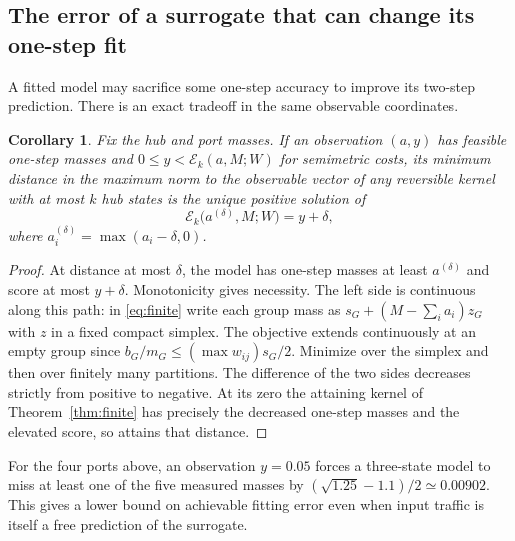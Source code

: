 \documentclass[11pt]{article}
\newtheorem{corollary}[theorem]{Corollary}
\newcommand{\E}{\mathcal E}
\begin{document}
\subsection{The error of a surrogate that can change its one-step fit}
A fitted model may sacrifice some one-step accuracy to improve its two-step prediction. There is an exact tradeoff in the same observable coordinates.
\begin{corollary}\label{cor:distance}
Fix the hub and port masses. If an observation \((a,y)\) has feasible one-step masses and \(0\le y<\E_k(a,M;W)\) for semimetric costs, its minimum distance in the maximum norm to the observable vector of any reversible kernel with at most \(k\) hub states is the unique positive solution of
\[
 \E_k\big(a^{(\delta)},M;W\big)=y+\delta ,
\]
where \(a^{(\delta)}_i=\max(a_i-\delta,0)\).
\end{corollary}
\begin{proof}
At distance at most \(\delta\), the model has one-step masses at least \(a^{(\delta)}\) and score at most \(y+\delta\). Monotonicity gives necessity. The left side is continuous along this path: in \eqref{eq:finite} write each group mass as \(s_G+(M-\sum_i a_i)z_G\) with \(z\) in a fixed compact simplex. The objective extends continuously at an empty group since \(b_G/m_G\le (\max w_{ij})s_G/2\). Minimize over the simplex and then over finitely many partitions. The difference of the two sides decreases strictly from positive to negative. At its zero the attaining kernel of Theorem~\ref{thm:finite} has precisely the decreased one-step masses and the elevated score, so attains that distance.
\end{proof}

For the four ports above, an observation \(y=0.05\) forces a three-state model to miss at least one of the five measured masses by \((\sqrt{1.25}-1.1)/2\simeq0.00902\). This gives a lower bound on achievable fitting error even when input traffic is itself a free prediction of the surrogate.
\end{document}
